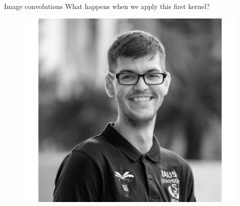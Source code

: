 \documentclass{beamer}
\begin{document}
\begin{frame}{Image convolutions}
What happens when we apply this first kernel?

\begin{minipage}{0.32\linewidth}
\begin{figure}
\includegraphics[width=\linewidth]{Images/conv1.png}
\end{figure}


\end{minipage}
\end{frame}
\end{document}
